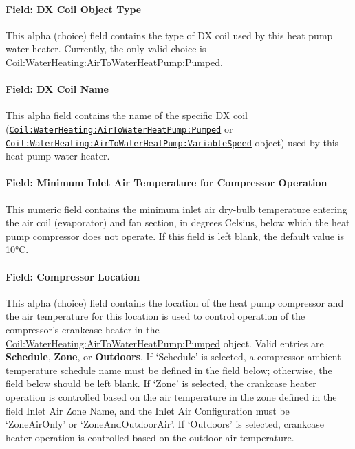 \paragraph{Field: DX Coil Object Type}\label{field-dx-coil-object-type}

This alpha (choice) field contains the type of DX coil used by this heat pump water heater. Currently, the only valid choice is \hyperref[coilwaterheatingairtowaterheatpumppumped]{Coil:WaterHeating:AirToWaterHeatPump:Pumped}.

\paragraph{Field: DX Coil Name}\label{field-dx-coil-name}

This alpha field contains the name of the specific DX coil (\hyperref[coilwaterheatingairtowaterheatpumppumped]{\lstinline!Coil:WaterHeating:AirToWaterHeatPump:Pumped!} or \hyperref[coil-waterheating-airtowaterheatpump-variablespeed]{\lstinline!Coil:WaterHeating:AirToWaterHeatPump:VariableSpeed!} object) used by this heat pump water heater.

\paragraph{Field: Minimum Inlet Air Temperature for Compressor Operation}\label{field-minimum-inlet-air-temperature-for-compressor-operation}

This numeric field contains the minimum inlet air dry-bulb temperature entering the air coil (evaporator) and fan section, in degrees Celsius, below which the heat pump compressor does not operate. If this field is left blank, the default value is 10°C.

\paragraph{Field: Compressor Location}\label{field-compressor-location}

This alpha (choice) field contains the location of the heat pump compressor and the air temperature for this location is used to control operation of the compressor's crankcase heater in the \hyperref[coilwaterheatingairtowaterheatpumppumped]{Coil:WaterHeating:AirToWaterHeatPump:Pumped} object. Valid entries are \textbf{Schedule}, \textbf{Zone}, or \textbf{Outdoors}. If `Schedule' is selected, a compressor ambient temperature schedule name must be defined in the field below; otherwise, the field below should be left blank. If `Zone' is selected, the crankcase heater operation is controlled based on the air temperature in the zone defined in the field Inlet Air Zone Name, and the Inlet Air Configuration must be `ZoneAirOnly' or `ZoneAndOutdoorAir'. If `Outdoors' is selected, crankcase heater operation is controlled based on the outdoor air temperature.

